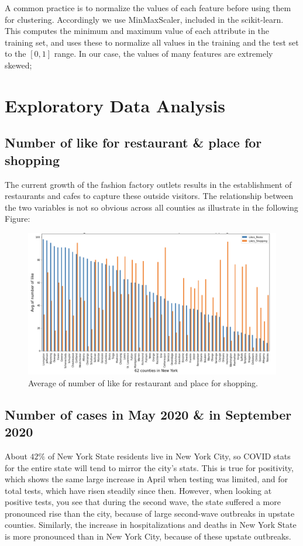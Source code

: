 \documentclass{article}
\begin{document}
A common practice is to normalize the values of each feature before using them for clustering.  Accordingly
we use MinMaxScaler, included in the scikit-learn. This computes the minimum and maximum value of each attribute in the training set, and uses these to normalize all values in the training and the test set to the $[0, 1]$ range. In our case, the values of many features are extremely skewed;

\section{Exploratory Data Analysis}

\subsection{Number of like for restaurant \& place for  shopping}
The current growth of the fashion factory outlets results in the establishment of restaurants and cafes to capture these outside visitors.   The relationship between the two variables is not so obvious across all counties as illustrate in the following Figure:
\begin{figure}[h]
 \centering
\includegraphics[width=1.06\textwidth]{compare1.png}
  \caption{Average of number of like for restaurant and place for shopping.}
\end{figure}


\subsection{Number of cases in May 2020 \& in September 2020}

About $42  \%$ of New York State residents live in New York City, so COVID stats for the entire state will tend to mirror the city's stats. This is true for positivity, which shows the same large increase in April when testing was limited, and for total tests, which have risen steadily since then. However, when looking at positive tests, you see that during the second wave, the state suffered a more pronounced rise than the city, because of large second-wave outbreaks in upstate counties. Similarly, the increase in hospitalizations and deaths in New York State is more pronounced than in New York City, because of these upstate outbreaks.\\
\end{document}
